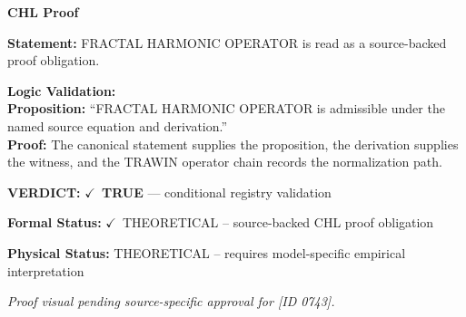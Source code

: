 \vspace{0.45em}
\noindent\textbf{CHL Proof}\par
\textbf{Statement:} FRACTAL HARMONIC OPERATOR is read as a source-backed proof obligation.

\textbf{Logic Validation:}\\
\textbf{Proposition:} ``FRACTAL HARMONIC OPERATOR is admissible under the named source equation and derivation.''\\
\textbf{Proof:} The canonical statement supplies the proposition, the derivation supplies the witness, and the TRAWIN operator chain records the normalization path.

\textbf{VERDICT:} \ensuremath{\checkmark}\ \textbf{TRUE} --- conditional registry validation

\textbf{Formal Status:} \ensuremath{\checkmark}\ THEORETICAL -- source-backed CHL proof obligation

\textbf{Physical Status:} THEORETICAL -- requires model-specific empirical interpretation
\par\vspace{0.45em}
\par
\vfill
\begingroup\footnotesize\itshape
Proof visual pending source-specific approval for [ID 0743].
\par\endgroup
\vfill
\endgroup
\endgroup

